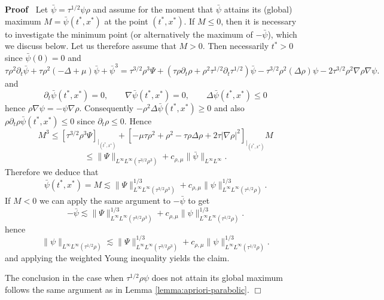 \documentclass[a4paper,11pt]{article}
\renewcommand{\leq}{\leqslant}
\renewcommand{\geq}{\geqslant}
\newenvironment{proof}{\noindent\textbf{Proof\ }}{\hspace*{\fill}$\Box$\medskip}
\numberwithin{equation}{section}
\newcommand{\8}{\infty}
\begin{document}
\begin{proof}
  Let $\bar{\psi} = \tau^{1 / 2} \psi \rho$ and assume for the moment that
  $\bar{\psi}$ attains its (global) maximum $M = \bar{\psi} (t^{\ast},
  x^{\ast})$ at the point $(t^{\ast}, x^{\ast})$. If $M \leq 0$, then it is
  necessary to investigate the minimum point (or alternatively the maximum of
  $- \bar{\psi}$), which we discuss below. Let us therefore assume that $M >
  0$. Then necessarily $t^{\ast} > 0$ since $\bar{\psi} (0) = 0$ and
  \[ \tau \rho^2 \partial_t  \bar{\psi} + \tau \rho^2 (- \Delta + \mu)
     \bar{\psi} + \bar{\psi}^3 = \tau^{3 / 2} \rho^3 \Psi + 
     (\tau \rho \partial_t \rho + \rho^2 \tau^{1 / 2} \partial_t \tau^{1 / 2})
     \bar{\psi} - \tau^{3 / 2} \rho^2  (\Delta \rho) \psi - 2 \tau^{3 / 2}
     \rho^2 \nabla \rho \nabla \psi . \]
  and
  \[ \partial_t  \bar{\psi} (t^{\ast}, x^{\ast}) = 0, \qquad \nabla \bar{\psi}
     (t^{\ast}, x^{\ast}) = 0, \qquad \Delta \bar{\psi} (t^{\ast}, x^{\ast})
     \leq 0 \]
  hence $\rho \nabla \psi = - \psi \nabla \rho$. Consequently $- \rho^2 \Delta
  \bar{\psi} (t^{\ast}, x^{\ast}) \geq 0$ and also $\rho \partial_t \rho
  \bar{\psi} (t^{\ast}, x^{\ast}) \leqslant 0$ since $\partial_t \rho
  \leqslant 0$. Hence
  \[ M^3 \leqslant [\tau^{3 / 2} \rho^3 \Psi ]_{|_{(t^{\ast}, x^{\ast})}} + [-\mu \tau\rho^2+\rho^2-\tau\rho\Delta\rho+2\tau |\nabla\rho|^{2}]_{|_{(t^{\ast}, x^{\ast})}} M \]
  \[ \leqslant \| \Psi \|_{L^{\infty} L^{\infty} (\tau^{3 / 2} \rho^3)} +
     c_{\rho, \mu} \| \bar{\psi} \|_{L^{\infty} L^{\infty}} . \]
  Therefore we deduce that
  \[ \bar{\psi} (t^{*},x^{*})= M \lesssim \| \Psi \|^{1 / 3}_{L^{\infty} L^{\infty}
     (\tau^{3 / 2} \rho^3)} + c_{\rho, \mu} \| \psi \|^{1 / 3}_{L^{\infty}
     L^{\infty} (\tau^{1 / 2} \rho)} . \]
  If $M < 0$ we can apply the same argument to $- \bar{\psi}$ to get
  \[ - \bar{\psi} \lesssim \| \Psi \|^{1 / 3}_{L^{\infty} L^{\infty} (\tau^{3
     / 2} \rho^3)} + c_{\rho, \mu} \| \psi \|^{1 / 3}_{L^{\infty} L^{\infty}
     (\tau^{1 / 2} \rho)} . \]
  hence
  \[ \| \psi \|_{L^{\infty} L^{\infty} (\tau^{1 / 2} \rho)} \lesssim \| \Psi
     \|^{1 / 3}_{L^{\infty} L^{\infty} (\tau^{3 / 2} \rho^3)} + c_{\rho, \mu}
     \| \psi \|^{1 / 3}_{L^{\infty} L^{\infty} (\tau^{1 / 2} \rho)} . \]
  and applying the weighted Young inequality yields the claim.


The conclusion in the case when $\tau^{1 / 2} \rho \psi$ does not
  attain its global maximum follows the same argument as in Lemma \ref{lemma:apriori-parabolic}.
\end{proof}
\end{document}
